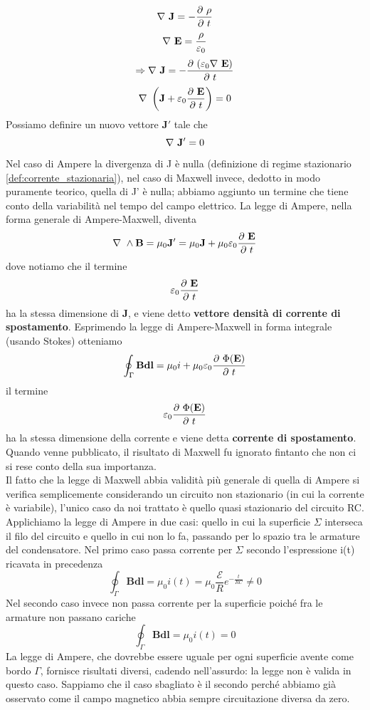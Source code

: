 \documentclass[
10pt, %
a4paper, %
oneside, %
headinclude,footinclude, %
BCOR5mm, %
]{scrartcl}
\begin{document}
\[\mathbf{\nabla\ }\mathbf{J}=-\frac{\partial\  \rho}{\partial\  t}\]
\[\mathbf{\nabla\ }\mathbf{E}=\frac{ \rho}{\varepsilon_0}\]
\[\Rightarrow \mathbf{\nabla\ }\mathbf{J}= -\frac{\partial\  (\varepsilon_0\mathbf{\nabla\ }\mathbf{E})}{\partial\  t}\]
\[\mathbf{\nabla\ }\left(\mathbf{J}+\varepsilon_0\frac{\partial\ \mathbf{E}}{\partial\  t}\right) = 0\]
Possiamo definire un nuovo vettore $\mathbf{J'}$ tale che
\[\mathbf{\nabla\ }\mathbf{J'}=0\]
Nel caso di Ampere la divergenza di J è nulla (definizione di regime stazionario \ref{def:corrente_stazionaria}), nel caso di Maxwell invece, dedotto in modo puramente teorico, quella di J' è nulla; abbiamo aggiunto un termine che tiene conto della variabilità nel tempo del campo elettrico. La legge di Ampere, nella forma generale di Ampere-Maxwell, diventa
\[\mathbf{\nabla\ }\wedge\mathbf{B}=\mu_0\mathbf{J'}=\mu_0\mathbf{J}+\mu_0\varepsilon_0\frac{\partial\ \mathbf{E}}{\partial\  t}\]
dove notiamo che il termine
\[\varepsilon_0\frac{\partial\ \mathbf{E}}{\partial\  t}\]
ha la stessa dimensione di \(\mathbf{J}\), e viene detto \textbf{vettore densità di corrente di spostamento}. Esprimendo la legge di Ampere-Maxwell in forma integrale (usando Stokes) otteniamo
\[\oint_{\Gamma}\mathbf{B}\mathbf{dl}= \mu_0i + \mu_0\varepsilon_0\frac{\partial\ \Phi(\mathbf{E})}{\partial\  t}\]
il termine
\[\varepsilon_0\frac{\partial\ \Phi(\mathbf{E})}{\partial\  t}\]
ha la stessa dimensione della corrente e viene detta \textbf{corrente di spostamento}.\\
Quando venne pubblicato, il risultato di Maxwell fu ignorato fintanto che non ci si rese conto della sua importanza.\\
Il fatto che la legge di Maxwell abbia validità più generale di quella di Ampere si verifica semplicemente considerando un circuito non stazionario (in cui la corrente è variabile), l'unico caso da noi trattato è quello quasi stazionario del circuito RC. Applichiamo la legge di Ampere in due casi: quello in cui la superficie $\Sigma$ interseca il filo del circuito e quello in cui non lo fa, passando per lo spazio tra le armature del condensatore. Nel primo caso passa corrente per $\Sigma$ secondo l'espressione i(t) ricavata in precedenza
\[\oint_{\Gamma}\mathbf{B}\mathbf{dl}=\mu_0 i(t)= \mu_0 \frac{\mathcal{E}}{R}e^{-\frac{t}{RC}}\neq0\]
Nel secondo caso invece non passa corrente per la superficie poiché fra le armature non passano cariche
\[\oint_{\Gamma}\mathbf{B}\mathbf{dl}=\mu_0 i(t)= 0\]
La legge di Ampere, che dovrebbe essere uguale per ogni superficie avente come bordo $\Gamma$, fornisce risultati diversi, cadendo nell'assurdo: la legge non è valida in questo caso. Sappiamo che il caso sbagliato è il secondo perché abbiamo già osservato come il campo magnetico abbia sempre circuitazione diversa da zero.\\
\end{document}
